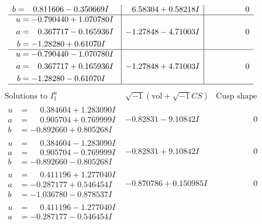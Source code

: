 \documentclass[1p]{elsarticle_modified}
\theoremstyle{definition}
\newcommand{\I}{\sqrt{-1}}
\begin{document}
$$\begin{array}{c|c|c}
\begin{aligned}
b &= \phantom{-}0.811606 - 0.350669 I\end{aligned}
 & \phantom{-}6.58304 + 0.58218 I & \phantom{-0.000000 } 0 \\ \hline\begin{aligned}
u &= -0.790440 + 1.070780 I \\
a &= \phantom{-}0.367717 - 0.165936 I \\
b &= -1.28280 + 0.61070 I\end{aligned}
 & -1.27848 - 4.71003 I & \phantom{-0.000000 } 0 \\ \hline\begin{aligned}
u &= -0.790440 - 1.070780 I \\
a &= \phantom{-}0.367717 + 0.165936 I \\
b &= -1.28280 - 0.61070 I\end{aligned}
 & -1.27848 + 4.71003 I & \phantom{-0.000000 } 0\\
 \hline 
 \end{array}$$\newpage$$\begin{array}{c|c|c}  
\text{Solutions to }I^u_{1}& \I (\text{vol} + \sqrt{-1}CS) & \text{Cusp shape}\\
 \hline 
\begin{aligned}
u &= \phantom{-}0.384604 + 1.283090 I \\
a &= \phantom{-}0.905704 + 0.769999 I \\
b &= -0.892660 + 0.805268 I\end{aligned}
 & -0.82831 - 9.10842 I & \phantom{-0.000000 } 0 \\ \hline\begin{aligned}
u &= \phantom{-}0.384604 - 1.283090 I \\
a &= \phantom{-}0.905704 - 0.769999 I \\
b &= -0.892660 - 0.805268 I\end{aligned}
 & -0.82831 + 9.10842 I & \phantom{-0.000000 } 0 \\ \hline\begin{aligned}
u &= \phantom{-}0.411196 + 1.277040 I \\
a &= -0.287177 + 0.546454 I \\
b &= -1.036780 - 0.878537 I\end{aligned}
 & -0.870786 + 0.150985 I & \phantom{-0.000000 } 0 \\ \hline\begin{aligned}
u &= \phantom{-}0.411196 - 1.277040 I \\
a &= -0.287177 - 0.546454 I \\

\end{aligned}
\end{array}$$
\end{document}
